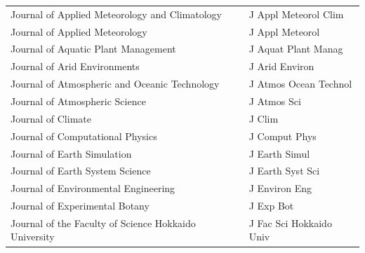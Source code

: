 \begin{longtable}{| p{8 cm} | p{6 cm} |}
Journal of Applied Meteorology and Climatology & J Appl Meteorol Clim \\
Journal of Applied Meteorology & J Appl Meteorol \\
Journal of Aquatic Plant Management & J Aquat Plant Manag \\
Journal of Arid Environments & J Arid Environ \\
Journal of Atmospheric and Oceanic Technology & J Atmos Ocean Technol \\
Journal of Atmospheric Science & J Atmos Sci \\
Journal of Climate & J Clim \\
Journal of Computational Physics & J Comput Phys \\
Journal of Earth Simulation & J Earth Simul \\
Journal of Earth System Science & J Earth Syst Sci \\
Journal of Environmental Engineering & J Environ Eng \\
Journal of Experimental Botany & J Exp Bot \\
Journal of the Faculty of Science Hokkaido University & J Fac Sci Hokkaido Univ \\
\hline
\end{longtable}

\pagebreak[4]

